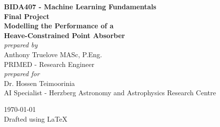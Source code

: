 \documentclass[12pt, letterpaper]{report}
\theoremstyle{definition}
\begin{document}

\begin{titlepage}
	\begin{center}
		\LARGE \textbf{BIDA407 - Machine Learning Fundamentals} \\
		\vspace{8mm}
        \LARGE \textbf{Final Project} \\
        \vspace{8mm}
        \Large \textbf{Modelling the Performance of a\\Heave-Constrained Point Absorber} \\
		\vfill
		\normalsize\textit{prepared by} \\
		\vspace{10mm}
		\large Anthony Truelove \footnotesize MASc, P.Eng. \\
        \vspace{4mm}
        \normalsize PRIMED - Research Engineer \\
        \vspace{30mm}
        \normalsize\textit{prepared for} \\
        \vspace{10mm}
        \large Dr. Hossen Teimoorinia \\
        \vspace{4mm}
        \normalsize AI Specialist - Herzberg Astronomy and Astrophysics Research Centre \\
	\end{center}
	\vfill
	\begin{center}
		\today \\
		\vspace{3mm}
		Drafted using \LaTeX
	\end{center}	   
\end{titlepage}







\newpage
{}
\tableofcontents

\newpage
{}
\listoftables

\newpage
{}
\listoffigures



\newpage
{}
\linenumbers










\newpage
{}
 
%
\end{document}
